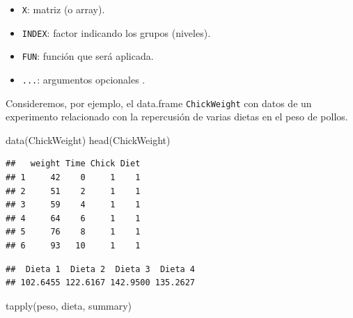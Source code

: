 \documentclass[
]{book}
\newenvironment{Shaded}{\begin{snugshade}}{\end{snugshade}}
\newcommand{\CommentTok}[1]{\textcolor[rgb]{0.56,0.35,0.01}{\textit{#1}}}
\newcommand{\FunctionTok}[1]{\textcolor[rgb]{0.00,0.00,0.00}{#1}}
\newcommand{\NormalTok}[1]{#1}
\newcommand{\OtherTok}[1]{\textcolor[rgb]{0.56,0.35,0.01}{#1}}
\newcommand{\SpecialCharTok}[1]{\textcolor[rgb]{0.00,0.00,0.00}{#1}}
\newcommand{\StringTok}[1]{\textcolor[rgb]{0.31,0.60,0.02}{#1}}
\providecommand{\tightlist}{%
  \setlength{\itemsep}{0pt}\setlength{\parskip}{0pt}}
\theoremstyle{break}
\begin{document}
\begin{itemize}
\tightlist
\item
  \texttt{X}: matriz (o array).
\item
  \texttt{INDEX}: factor indicando los grupos (niveles).
\item
  \texttt{FUN}: función que será aplicada.
\item
  \texttt{...}: argumentos opcionales .
\end{itemize}

Consideremos, por ejemplo, el data.frame \texttt{ChickWeight} con datos de un
experimento relacionado con la repercusión de varias dietas en el peso
de pollos.

\begin{Shaded}
\begin{Highlighting}[]
\FunctionTok{data}\NormalTok{(ChickWeight)}
\FunctionTok{head}\NormalTok{(ChickWeight)}
\end{Highlighting}
\end{Shaded}

\begin{verbatim}
##   weight Time Chick Diet
## 1     42    0     1    1
## 2     51    2     1    1
## 3     59    4     1    1
## 4     64    6     1    1
## 5     76    8     1    1
## 6     93   10     1    1
\end{verbatim}

\begin{Shaded}
\end{Shaded}

\begin{verbatim}
##  Dieta 1  Dieta 2  Dieta 3  Dieta 4 
## 102.6455 122.6167 142.9500 135.2627
\end{verbatim}

\begin{Shaded}
\begin{Highlighting}[]
\FunctionTok{tapply}\NormalTok{(peso, dieta, summary)}
\end{Highlighting}
\end{Shaded}
\end{document}

